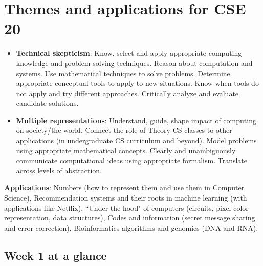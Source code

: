\section*{Themes and applications for CSE 20}
\begin{itemize}
\item {\bf Technical skepticism}: Know, select and apply appropriate computing knowledge and problem-solving techniques. 
Reason about computation and systems. 
Use mathematical techniques to solve problems. 
Determine appropriate conceptual tools to apply to new situations. 
Know when tools do not apply and try different approaches. 
Critically analyze and evaluate candidate solutions.
\item {\bf Multiple representations}: Understand, guide, shape impact of computing on society/the world. 
Connect the role of Theory CS classes to other applications (in undergraduate CS curriculum and beyond). 
Model problems using appropriate mathematical concepts.
Clearly and unambiguously communicate computational ideas using appropriate formalism. 
Translate across levels of abstraction.
\end{itemize}

{\bf Applications}: Numbers (how to represent them and use them in Computer Science), 
Recommendation systems and their roots in machine learning (with applications like Netflix),
``Under the hood" of computers (circuits, pixel color representation, data structures),
Codes and information (secret message sharing and error correction),
Bioinformatics algorithms and genomics (DNA and RNA).

\newpage

\subsection*{Week 1 at a glance}

